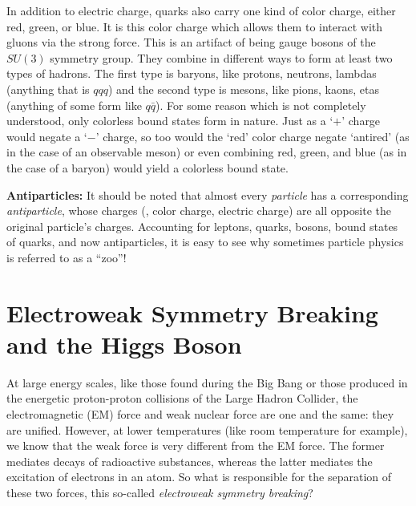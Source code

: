 In addition to electric charge, quarks also carry one kind of color charge, either red, green, or blue. 
It is this color charge which allows them to interact with gluons via the strong force. 
This is an artifact of being gauge bosons of the $SU(3)$ symmetry group.
They combine in different ways to form at least two types of hadrons.
The first type is baryons, like protons, neutrons, lambdas (anything that is $qqq$) and the second type is mesons, like pions, kaons, etas (anything of some form like $q\bar{q}$).
For some reason which is not completely understood, only colorless bound states form in nature. 
Just as a `$+$' charge would negate a `$-$' charge, so too would the `red' color charge negate `antired' (as in the case of an observable meson) or even combining red, green, and blue (as in the case of a baryon) would yield a colorless bound state.

{\bf Antiparticles:} It should be noted that almost every \emph{particle} has a corresponding \emph{antiparticle}, whose charges (\eg, color charge, electric charge) are all opposite the original particle's charges.
Accounting for leptons, quarks, bosons, bound states of quarks, and now antiparticles, it is easy to see why sometimes particle physics is referred to as a ``zoo''!

\section{Electroweak Symmetry Breaking and the Higgs Boson}
\label{sec:EWSB}
At large energy scales, like those found during the Big Bang or those produced in the energetic proton-proton collisions of the Large Hadron Collider, the electromagnetic (EM) force and weak nuclear force are one and the same: they are unified.
However, at lower temperatures (like room temperature for example), we know that the weak force is very different from the EM force.
The former mediates decays of radioactive substances, whereas the latter mediates the excitation of electrons in an atom.
So what is responsible for the separation of these two forces, this so-called \emph{electroweak symmetry breaking}?


